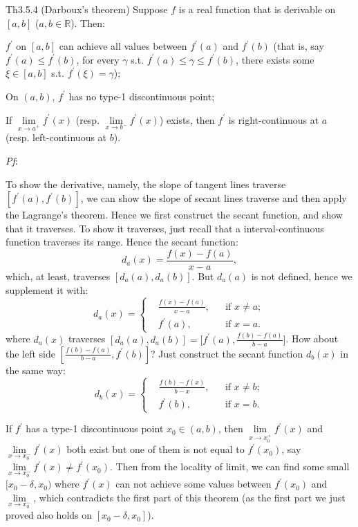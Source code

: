 \documentclass{article}
\begin{document}
\begin{Th}{Th3.5.4 (Darboux's theorem)}
    Suppose $f$ is a real function that is derivable on $[a, b]$ ($a, b\in\mathbb{R}$). Then:
    \begin{compactenum}
        \item $f^\prime$ on $[a,b]$ can achieve all values between $f^\prime(a)$ and $f^\prime(b)$ (that is, say $f^\prime(a) \leq f^\prime(b)$, for every $\gamma$ s.t. $f^\prime(a)\leq\gamma\leq f^\prime(b)$, there exists some $\xi\in [a,b]$ s.t. $f^\prime(\xi) = \gamma$);
        \item On $(a,b)$, $f^\prime$ has no type-1 discontinuous point;
        \item If $\lim\limits_{x\to a^+} f^\prime(x)$ (resp. $\lim\limits_{x\to b^-} f^\prime(x)$) exists, then $f^\prime$ is right-continuous at $a$ (resp. left-continuous at $b$).
    \end{compactenum}
    \tcblower
    \textit{Pf}:
    \begin{compactenum}
        \item To show the derivative, namely, the slope of tangent lines traverse $[f^\prime(a), f^\prime(b)]$, we can show the slope of secant lines traverse and then apply the Lagrange's theorem. Hence we first construct the secant function, and show that it traverses. To show it traverses, just recall that a interval-continuous function traverses its range. Hence the secant function:
        $$ d_a(x) = \frac{f(x)-f(a)}{x-a}, $$
        which, at least, traverses $[d_a(a), d_a(b)]$. But $d_a(a)$ is not defined, hence we supplement it with:
        $$ d_a(x) = \left\{
            \begin{aligned}
                &\frac{f(x)-f(a)}{x-a}, && \text{if } x\neq a;\\
                &f^\prime(a), && \text{if } x = a.
            \end{aligned}\right.
        $$
        where $d_a(x)$ traverses $[d_a(a), d_a(b)] = \Big[f^\prime(a), \frac{f(b)-f(a)}{b-a}\Big]$.
        How about the left side $[\frac{f(b)-f(a)}{b-a}, f^\prime(b)]$? Just construct the secant function $d_b(x)$ in the same way:
        $$ d_b(x) = \left\{ 
            \begin{aligned}
                &\frac{f(b)-f(x)}{b-x}, && \text{if } x\neq b;\\
                &f^\prime(b), && \text{if } x = b.
            \end{aligned}\right.
        $$
        \item If $f^\prime$ has a type-1 discontinuous point $x_0\in (a,b)$, then $\lim\limits_{x\to x_0^+} f^\prime(x)$ and $\lim\limits_{x\to x_0^-} f^\prime(x)$ both exist but one of them is not equal to $f^\prime(x_0)$, say $\lim\limits_{x\to x_0^-} f^\prime(x) \neq f^\prime(x_0)$. Then from the locality of limit, we can find some small $[x_0-\delta, x_0)$ where $f^\prime(x)$ can not achieve some values between $f^\prime(x_0)$ and $\lim\limits_{x\to x_0^-}$, which contradicts the first part of this theorem (as the first part we just proved also holds on $[x_0-\delta, x_0]$).

\end{compactenum}
\end{Th}
\end{document}

